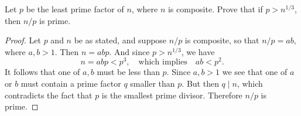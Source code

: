  Let $p$ be the least prime factor of $n$, where $n$ is
composite. Prove that if $p > n^{1/3}$, then $n/p$ is prime.
\begin{proof}
  Let $p$ and $n$ be as stated, and suppose $n/p$ is composite, so
  that $n/p = ab$, where $a,b > 1$. Then $n = abp$. And since
  $p > n^{1/3}$, we have
  \begin{equation*}
    n = abp < p^3,
    \quad\text{which implies}\quad
    ab < p^2.
  \end{equation*}
  It follows that one of $a,b$ must be less than $p$. Since $a,b > 1$
  we see that one of $a$ or $b$ must contain a prime factor $q$
  smaller than $p$. But then $q\mid n$, which contradicts the fact
  that $p$ is the smallest prime divisor. Therefore $n/p$ is prime.
\end{proof}
